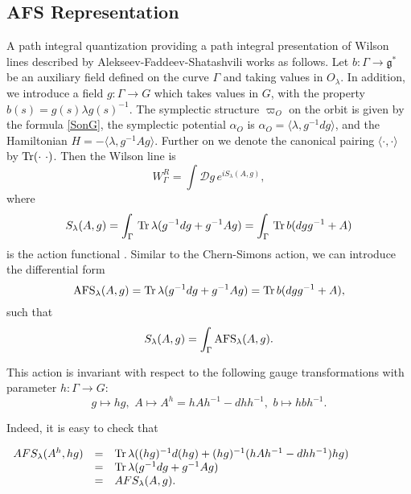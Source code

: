 \documentclass[11pt]{report}
\theoremstyle{plain}
\theoremstyle{definition}
\theoremstyle{remark}
\theoremstyle{remark}
\numberwithin{equation}{section}
\begin{document}
\subsection{AFS Representation}\label{AFS_line}

A path integral quantization providing a path integral presentation of Wilson lines described by Alekseev-Faddeev-Shatashvili \cite{AFS} works as follows. Let $b: \Gamma \to \mathfrak{g}^*$ be an auxiliary field defined on the curve $\Gamma$ and taking values in $O_\lambda$. In addition, we introduce a field $g: \Gamma \to G$ which takes values in $G$, with the property $b(s)=g(s) \lambda g(s)^{-1}$. 
The symplectic structure $\varpi_O$ on the orbit is given by the formula \eqref{SonG}, the symplectic potential $\alpha_O$ is $\alpha_O = \langle \lambda, g^{-1}dg\rangle$, and the Hamiltonian $H = - \langle \lambda, g^{-1}Ag\rangle$. Further on we denote the canonical pairing $\langle \cdot , \cdot \rangle$ by ${\rm Tr}( \cdot \, \, \cdot)$.
Then the Wilson line is
%
\begin{equation}
W_\Gamma^R = \int {\mathcal{D}} g \, e^{i S_\lambda(A,g)},
\end{equation}
where 
%
\begin{equation}\label{S(g)}
S_\lambda(A, g) =  \int_\Gamma \, {\rm Tr} \, \lambda(g^{-1} dg + g^{-1} A g) =
\int_\Gamma \, {\rm Tr} \, b(dg g^{-1} + A)
\end{equation}
is the action functional . 
Similar to the Chern-Simons action, we can introduce the differential form
%
$$
{\rm AFS}_\lambda(A,g) = {\rm Tr} \, \lambda(g^{-1} dg + g^{-1} A g) =  {\rm Tr} \, b(dg g^{-1} + A),
$$
such that
%
$$
S_\lambda(A,g) = \int_\Gamma {\rm AFS}_\lambda(A,g).
$$


This action is invariant with respect to the following gauge transformations with parameter $h: \Gamma \to G$:
$$ g \mapsto hg, \,\, A \mapsto A^h=hAh^{-1} - dhh^{-1}, \,\, b \mapsto hbh^{-1}.$$

Indeed, it is easy to check that  
%
\begin{spacing}{1.45}
$
\begin{array}{lll}
AFS_\lambda (A^h, hg) & = &  {\rm Tr} \, \lambda((hg)^{-1} d(hg) + (hg)^{-1} (hAh^{-1} - dhh^{-1}) hg) \\
& = & {\rm Tr} \, \lambda(g^{-1} dg + g^{-1} A g)\\
& = & AFS_\lambda(A,g).
\end{array}
$
\end{spacing}
\end{document}
